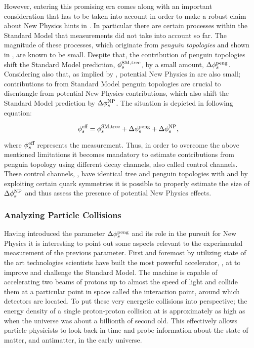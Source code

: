 However, entering this promising era comes along with an important consideration
that has to be taken into account in order to make a robust claim about New Physics hints in \phis.
In particular there are certain processes within the Standard Model that \phis measurements
did not take into account so far. The magnitude of these processes, which originate from {\it penguin topologies}
and shown in , are known to be small. Despite that, the
contribution of penguin topologies shift the Standard Model prediction,
$\phi_{s}^{\tiny \text{SM,tree}}$, by a small amount, $\Delta\phi_{s}^{\tiny\text{peng}}$. Considering
also that, as implied by , potential New Physics
in \phis are also small; contributions to \phis from Standard Model penguin
topologies are crucial to disentangle from potential New Physics contributions, which also
shift the Standard Model prediction by $\Delta\phi_{s}^{\tiny \text{NP}}$.
The situation is depicted in following equation:

\begin{equation}
\centering
 \phis^{\text {eff}} = \phis^{\tiny \text{SM,tree}} + \Delta\phiS{peng} + \Delta\phis^{\tiny \text{NP}},
 \label{app_phis_sm_peng}
\end{equation}

\noindent where $\phi_{s}^{\text {eff}}$ represents the \phis measurement.
Thus, in order to overcome the above mentioned limitations it becomes mandatory to estimate
contributions from penguin topology using different decay channels, also called control channels.
These control channels, \eg \BsJpsiKst, have identical tree and penguin topologies with \BsJpsiPhi
and by exploiting certain quark symmetries it is possible to properly estimate the size of
$\Delta\phi_{s}^{\tiny \text{NP}}$ and thus assess the presence of potential New Physics effects.

\subsubsection{Analyzing Particle Collisions}

Having introduced the parameter $\Delta\phi_{s}^{\tiny\text{peng}}$ and its role in the pursuit for New Physics
it is interesting to point out some aspects relevant to the experimental measurement of the previous parameter.
First and foremost by utilizing state of the art technologies scientists have built the most
powerful accelerator, \lhc, at \cern to improve and challenge the Standard Model. The machine is
capable of accelerating two beams of protons up to almost the speed of light and collide them at
a particular point in space called the interaction point, around which detectors are located.
To put these very energetic collisions into perspective; the energy density of a single proton-proton
collision at \lhc is approximately as high as when the universe was about a billionth of second old.
This effectively allows particle physicists to look back in time and probe information about the
state of matter, and antimatter, in the early universe.

